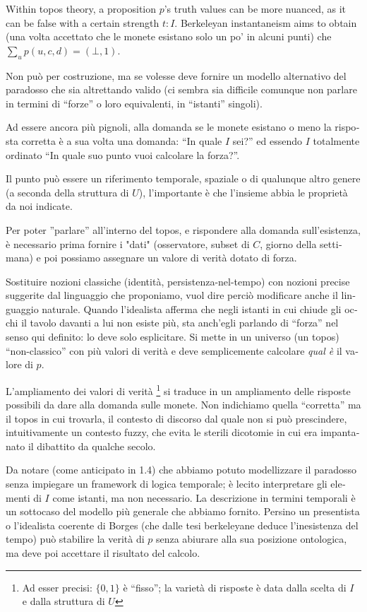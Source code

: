 \begin{italian}
	Within topos theory, a proposition $p$'s truth values can be more nuanced, as it can be false with a certain strength $t : I$. Berkeleyan instantaneism aims to obtain (una volta accettato che le monete esistano solo un po' in alcuni punti) che $\sum_u p(u,c,d) = (\bot,1)$.

	Non può per costruzione, ma se volesse deve fornire un modello alternativo del paradosso che sia altrettando valido (ci sembra sia difficile comunque non parlare in termini di ``forze'' o loro equivalenti, in ``istanti'' singoli).

	Ad essere ancora più pignoli, alla domanda se le monete esistano o meno la risposta corretta è a sua volta una domanda: ``In quale $I$ sei?'' ed essendo $I$ totalmente ordinato ``In quale suo punto vuoi calcolare la forza?''.

	Il punto può essere un riferimento temporale, spaziale o di qualunque altro genere (a seconda della struttura di $U$), l'importante è che l'insieme abbia le proprietà da noi indicate.

	Per poter ''parlare'' all'interno del topos, e rispondere alla domanda sull'esistenza, è necessario prima fornire i "dati" (osservatore, subset di $C$, giorno della settimana) e poi possiamo assegnare un valore di verità dotato di forza.

	Sostituire nozioni classiche (identità, persistenza-nel-tempo) con nozioni precise suggerite dal linguaggio che proponiamo, vuol dire perciò modificare anche il linguaggio naturale. Quando l'idealista afferma che negli istanti in cui chiude gli occhi il tavolo davanti a lui non esiste più, sta anch'egli parlando di ``forza'' nel senso qui definito: lo deve solo esplicitare. Si mette in un universo (un topos) ``non-classico'' con più valori di verità e deve semplicemente calcolare \emph{qual è} il valore di $p$.

	L'ampliamento dei valori di verità \footnote{Ad esser precisi: $\{0,1\}$ è ``fisso''; la varietà di risposte è data dalla scelta di $I$ e dalla struttura di $U$} si traduce in un ampliamento delle risposte possibili da dare alla domanda sulle monete. Non indichiamo quella ``corretta'' ma il topos in cui trovarla, il contesto di discorso dal quale non si può prescindere, intuitivamente un contesto fuzzy, che evita le sterili dicotomie in cui era impantanato il dibattito da qualche secolo.

	Da notare (come anticipato in 1.4) che abbiamo potuto modellizzare il paradosso senza impiegare un framework di logica temporale; è lecito interpretare gli elementi di $I$ come istanti, ma non necessario. La descrizione in termini temporali è un sottocaso del modello più generale che abbiamo fornito. Persino un presentista o l'idealista coerente di Borges (che dalle tesi berkeleyane deduce l'inesistenza del tempo) può stabilire la verità di $p$ senza abiurare alla sua posizione ontologica, ma deve poi accettare il risultato del calcolo.


\end{italian}
